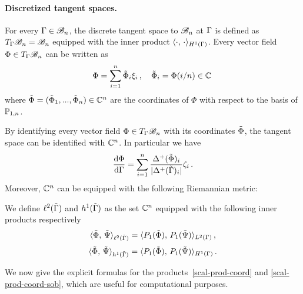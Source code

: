 \paragraph{Discretized tangent spaces.}  

For every  $\Gamma\in\mathcal{B}_n$, the discrete tangent space to $\mathcal{B}_n$ at $\Gamma$ is defined as  $T_{\Gamma} \mathcal{B}_n = \mathcal{B}_n$ equipped with the  inner product $\langle \cdot,\,\cdot\rangle_{H^1(\Gamma)}$. Every vector field $\Phi\in T_\Gamma \mathcal{B}_n$ can be written as
\begin{equation}\label{representation-phi}
\Phi=\sum_{i=1}^n \tilde{\Phi}_i\xi_i\,,\quad \tilde{\Phi}_i=\Phi(i/n)\in \mathbb{C}\,
\end{equation}
where $\tilde{\Phi}=(\tilde{\Phi}_1, ..., \tilde{\Phi}_n)\in \mathbb{C}^n$ are the coordinates of $\Phi$ with respect to the basis of $\mathbb{P}_{1,n}$. 

By identifying every vector field $\Phi \in T_\Gamma\mathcal{B}_n$ with its coordinates $\tilde{\Phi}$, the tangent space can be identified with  $\mathbb{C}^n$. 
In particular we have 
\begin{equation}\label{arc-length-2}
	\frac{\mathrm{d}\Phi}{\mathrm{d} \Gamma} = \sum_{i=1}^n \frac{\Delta^+(\tilde{\Phi})_i}{|\Delta^+(\tilde{\Gamma})_i|}\zeta_i\,.
\end{equation}
Moreover, $\mathbb{C}^n$ can be equipped with the following Riemannian metric:
 \begin{defn}
 We define $\ell^2(\tilde{\Gamma})$ and  $h^1(\tilde{\Gamma})$ as the set $\mathbb{C}^n$ equipped with the following inner products respectively
 \begin{equation}\label{scal-prod-coord} 
	\langle \tilde{\Phi},\,\tilde{ \Psi}\rangle_{\ell^2(\tilde{\Gamma})} = 
	\langle P_1(\tilde{\Phi}),\,P_1(\tilde{\Psi})\rangle_{L^2(\Gamma)}  \,,
\end{equation} 
\begin{equation}\label{scal-prod-coord-sob} 
	\langle \tilde{\Phi},\,\tilde{ \Psi}\rangle_{h^1(\tilde{\Gamma})} = 
	\langle P_1(\tilde{\Phi}),\,P_1(\tilde{\Psi})\rangle_{H^1(\Gamma)}  \,. 
\end{equation} 
 \end{defn}

We now give the explicit formulas for the products~\eqref{scal-prod-coord} and \eqref{scal-prod-coord-sob}, which are  useful for computational purposes. 

